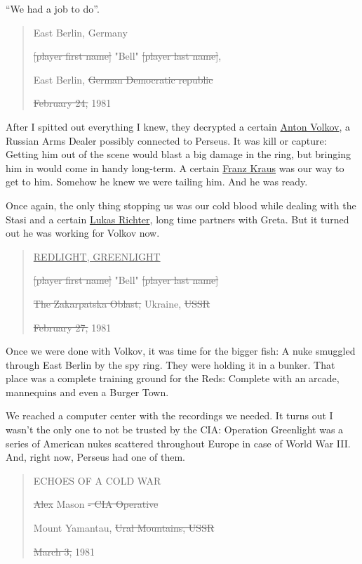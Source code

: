 \documentclass{article}
\begin{document}
“We had a job to do”.

\begin{quote}
    East Berlin, Germany
    
    \sout{[player first name]} "Bell" \sout{[player last name]},
    
    East Berlin, \sout{German Democratic republic}
    
    \sout{February 24,} 1981
\end{quote}

After I spitted out everything I knew, they decrypted a certain \href{https://callofduty.fandom.com/wiki/Anton_Volkov}{Anton Volkov}, a Russian Arms Dealer possibly connected to Perseus. It was kill or capture: Getting him out of the scene would blast a big damage in the ring, but bringing him in would come in handy long-term. A certain \href{https://callofduty.fandom.com/wiki/Franz_Kraus}{Franz Kraus} was our way to get to him. Somehow he knew we were tailing him. And he was ready.

Once again, the only thing stopping us was our cold blood while dealing with the Stasi and a certain \href{https://callofduty.fandom.com/wiki/Lukas_Richter}{Lukas Richter}, long time partners with Greta. But it turned out he was working for Volkov now.

\begin{quote}
    \underline{REDLIGHT, GREENLIGHT}
    
    \sout{[player first name]} "Bell" \sout{[player last name]}
    
    \sout{The Zakarpatska Oblast,} Ukraine, \sout{USSR}
    
    \sout{February 27,} 1981
\end{quote}

Once we were done with Volkov, it was time for the bigger fish: A nuke smuggled through East Berlin by the spy ring. They were holding it in a bunker. That place was a complete training ground for the Reds: Complete with an arcade, mannequins and even a Burger Town.

We reached a computer center with the recordings we needed. It turns out I wasn't the only one to not be trusted by the CIA: Operation Greenlight was a series of American nukes scattered throughout Europe in case of World War III. And, right now, Perseus had one of them.

\begin{quote}
    ECHOES OF A COLD WAR
    
    \sout{Alex} Mason \sout{- CIA Operative}
    
    Mount Yamantau, \sout{Ural Mountains, USSR}
    
    \sout{March 3,} 1981
\end{quote}
\end{document}
